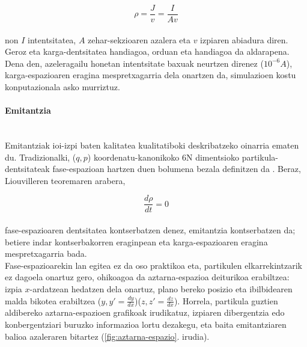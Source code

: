 \documentclass[12pt]{article}
\numberwithin{figure}{section}
\numberwithin{equation}{section}
\begin{document}
\begin{equation}
    \rho = \frac{J}{v}=\frac{I}{Av}
\end{equation}
\\
non $I$ intentsitatea, $A$ zehar-sekzioaren azalera eta $v$ izpiaren abiadura diren.\\

Geroz eta karga-dentsitatea handiagoa, orduan eta handiagoa da aldarapena. Dena den, azeleragailu honetan intentsitate baxuak neurtzen direnez ($10^{-6}A$), karga\hyp{}espazioaren eragina mespretxagarria dela onartzen da, simulazioen kostu konputazionala asko murriztuz.
\paragraph{Emitantzia}\leavevmode\\

Emitantziak ioi-izpi baten kalitatea kualitatiboki deskribatzeko oinarria ematen du. Tradizionalki, ($q,p$) koordenatu-kanonikoko 6N dimentsioko partikula\hyp{}dentsitateak fase-espazioan hartzen duen bolumena bezala definitzen da \cite{scrivens_requirements_2014}. Beraz, Liouvilleren teoremaren arabera,

\begin{equation}
    \frac{d\rho}{dt}=0
\end{equation}
\\
fase-espazioaren dentsitatea kontserbatzen denez, emitantzia kontserbatzen da; betiere indar kontserbakorren eraginpean eta karga-espazioaren eragina mespretxagarria bada. \\

Fase-espazioarekin lan egitea ez da oso praktikoa eta, partikulen elkarrekintzarik ez dagoela onartuz gero, ohikoagoa da aztarna-espazioa deiturikoa erabiltzea: izpia $x$-ardatzean hedatzen dela onartuz, plano bereko posizio eta ibilbidearen malda bikotea erabiltzea ($y,y'=\frac{dy}{dx}$)($z,z'=\frac{dz}{dx}$). Horrela, partikula guztien aldibereko aztarna-espazioen grafikoak irudikatuz, izpiaren dibergentzia edo konbergentziari buruzko informazioa lortu dezakegu, eta baita emitantziaren balioa azaleraren bitartez (\ref{fig:aztarna-espazio}. irudia).\\
\end{document}
